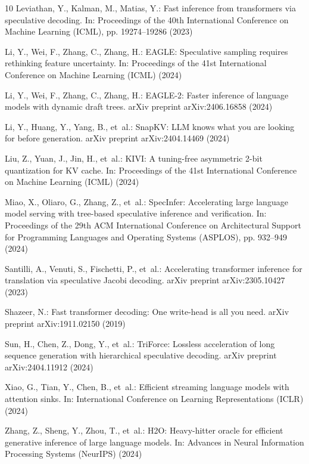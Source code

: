 \documentclass[runningheads]{llncs}
\begin{document}
\begin{thebibliography}{10}
Leviathan, Y., Kalman, M., Matias, Y.:
Fast inference from transformers via speculative decoding.
In: Proceedings of the 40th International Conference on Machine Learning (ICML), pp. 19274--19286 (2023)

Li, Y., Wei, F., Zhang, C., Zhang, H.:
EAGLE: Speculative sampling requires rethinking feature uncertainty.
In: Proceedings of the 41st International Conference on Machine Learning (ICML) (2024)

Li, Y., Wei, F., Zhang, C., Zhang, H.:
EAGLE-2: Faster inference of language models with dynamic draft trees.
arXiv preprint arXiv:2406.16858 (2024)

Li, Y., Huang, Y., Yang, B., et~al.:
SnapKV: LLM knows what you are looking for before generation.
arXiv preprint arXiv:2404.14469 (2024)

Liu, Z., Yuan, J., Jin, H., et~al.:
KIVI: A tuning-free asymmetric 2-bit quantization for KV cache.
In: Proceedings of the 41st International Conference on Machine Learning (ICML) (2024)

Miao, X., Oliaro, G., Zhang, Z., et~al.:
SpecInfer: Accelerating large language model serving with tree-based speculative inference and verification.
In: Proceedings of the 29th ACM International Conference on Architectural Support for Programming Languages and Operating Systems (ASPLOS), pp. 932--949 (2024)

Santilli, A., Venuti, S., Fischetti, P., et~al.:
Accelerating transformer inference for translation via speculative Jacobi decoding.
arXiv preprint arXiv:2305.10427 (2023)

Shazeer, N.:
Fast transformer decoding: One write-head is all you need.
arXiv preprint arXiv:1911.02150 (2019)

Sun, H., Chen, Z., Dong, Y., et~al.:
TriForce: Lossless acceleration of long sequence generation with hierarchical speculative decoding.
arXiv preprint arXiv:2404.11912 (2024)

Xiao, G., Tian, Y., Chen, B., et~al.:
Efficient streaming language models with attention sinks.
In: International Conference on Learning Representations (ICLR) (2024)

Zhang, Z., Sheng, Y., Zhou, T., et~al.:
H2O: Heavy-hitter oracle for efficient generative inference of large language models.
In: Advances in Neural Information Processing Systems (NeurIPS) (2024)

\end{thebibliography}
\end{document}
